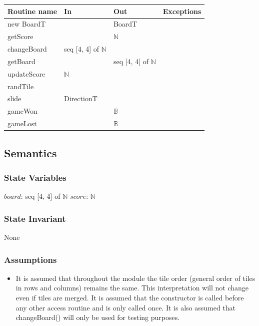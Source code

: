 \documentclass[12pt]{article}
\begin{document}
\begin{tabular}{| l | l | l | p{6cm} |}
\hline
\textbf{Routine name} & \textbf{In} & \textbf{Out} & \textbf{Exceptions}\\
\hline
new BoardT & ~ & BoardT &  \\
\hline
getScore & ~ & $\mathbb{N}$ & \\
\hline
changeBoard & seq [4, 4] of $\mathbb{N}$& ~ &\\
\hline
getBoard & ~ & seq [4, 4] of $\mathbb{N}$ & \\
\hline
updateScore & $\mathbb{N}$ & ~ & \\
\hline
randTile & ~ & ~ & \\
\hline
slide & DirectionT & ~ & \\
\hline
gameWon & ~ & $\mathbb{B}$ & \\
\hline
gameLost & ~ & $\mathbb{B}$ & \\
\hline
\end{tabular}

\subsection* {Semantics}

\subsubsection* {State Variables}

$board$: seq [4, 4] of $\mathbb{N}$\newline
$score$: $\mathbb{N}$

\subsubsection* {State Invariant}

None

\subsubsection* {Assumptions}

\begin{itemize}
\item It is assumed that throughout the module the tile order (general order of tiles in rows and columns) remains the same. This interpretation will not change even if tiles are merged. It is assumed that the constructor is called before any other access routine and is only called once. It is also assumed that changeBoard() will only be used for testing purposes. 
\end{itemize}
\end{document}
